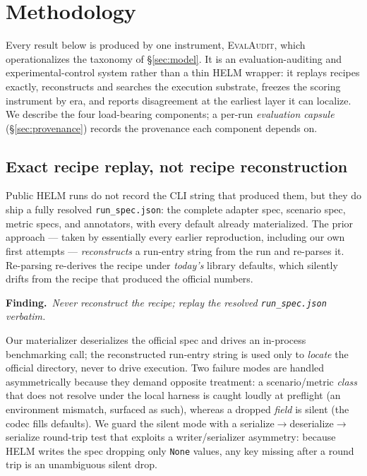 \section{Methodology}
\label{sec:system}

Every result below is produced by one instrument, \textsc{EvalAudit}, which
operationalizes the taxonomy of \S\ref{sec:model}. It
is an evaluation-auditing and experimental-control system rather than a thin HELM
wrapper: it replays recipes exactly, reconstructs and searches the execution
substrate, freezes the scoring instrument by era, and reports disagreement at the
earliest layer it can localize. We describe the four load-bearing components; a
per-run \emph{evaluation capsule} (\S\ref{sec:provenance}) records the provenance
each component depends on.

\subsection{Exact recipe replay, not recipe reconstruction}
\label{sec:fromspec}

Public HELM runs do not record the CLI string that produced them, but they do
ship a fully resolved \texttt{run\_spec.json}: the complete adapter spec, scenario
spec, metric specs, and annotators, with every default already materialized. The
prior approach --- taken by essentially every earlier reproduction, including our
own first attempts --- \emph{reconstructs} a run-entry string from the run and
re-parses it. Re-parsing re-derives the recipe under \emph{today's} library
defaults, which silently drifts from the recipe that produced the official
numbers.
\par\smallskip\noindent\textbf{Finding.}~\emph{Never reconstruct the recipe; replay the resolved \texttt{run\_spec.json}
verbatim.}\par\smallskip
Our materializer deserializes the official spec and drives an in-process
benchmarking call; the reconstructed run-entry string is used only to \emph{locate}
the official directory, never to drive execution. Two failure modes are handled
asymmetrically because they demand opposite treatment: a scenario/metric
\emph{class} that does not resolve under the local harness is caught loudly at
preflight (an environment mismatch, surfaced as such), whereas a dropped
\emph{field} is silent (the codec fills defaults). We guard the silent mode with a
serialize$\to$deserialize$\to$serialize round-trip test that exploits a
writer/serializer asymmetry: because HELM writes the spec dropping only
\texttt{None} values, any key missing after a round trip is an unambiguous silent
drop.

